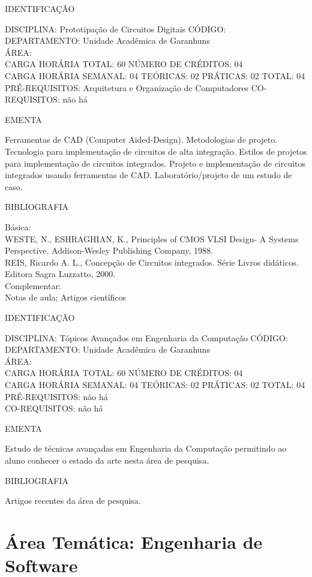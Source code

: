 \documentclass[
	12pt,				%
	openright,			%
  oneside,     %
	a4paper,			%
	english,			%
	french,				%
	spanish,			%
	brazil				%
	]{abntex2}
\begin{document}
\begin{apendicesenv}
\newpage IDENTIFICAÇÃO

DISCIPLINA: Prototipação de Circuitos Digitais CÓDIGO:\\ 
DEPARTAMENTO: Unidade Acadêmica de Garanhuns\\
ÁREA: \\
CARGA HORÁRIA TOTAL: 60 NÚMERO DE CRÉDITOS: 04\\
CARGA HORÁRIA SEMANAL: 04 TEÓRICAS: 02 PRÁTICAS: 02 TOTAL: 04\\
PRÉ-REQUISITOS: Arquitetura e Organização de Computadores
CO-REQUISITOS: não há

EMENTA 

Ferramentas de CAD (Computer Aided-Design). Metodologias de projeto.
Tecnologia para implementação de circuitos de alta integração. Estilos
de projetos para implementação de circuitos integrados. Projeto e
implementação de circuitos integrados usando ferramentas de CAD.
Laboratório/projeto de um estudo de caso.

BIBLIOGRAFIA 

Básica:\\
WESTE, N., ESHRAGHIAN, K., Principles of CMOS VLSI Design- A Systems
Perspective, Addison-Wesley Publishing Company, 1988.\\
REIS, Ricardo A. L., Concepção de Circuitos integrados. Série Livros
didáticos. Editora Sagra Luzzatto, 2000.\\
Complementar:\\
Notas de aula; Artigos científicos

\newpage IDENTIFICAÇÃO

DISCIPLINA: Tópicos Avançados em Engenharia da Computação CÓDIGO:\\ 
DEPARTAMENTO: Unidade Acadêmica de Garanhuns\\ 
ÁREA:\\
CARGA HORÁRIA TOTAL: 60 NÚMERO DE CRÉDITOS: 04\\
CARGA HORÁRIA SEMANAL: 04 TEÓRICAS: 02 PRÁTICAS: 02 TOTAL: 04\\
PRÉ-REQUISITOS: não há\\
CO-REQUISITOS: não há

EMENTA 

Estudo de técnicas avançadas em Engenharia da Computação permitindo ao
aluno conhecer o estado da arte nesta área de pesquisa.

BIBLIOGRAFIA 

Artigos recentes da área de pesquisa.
\newpage 

\section*{Área Temática: Engenharia de Software}


\end{apendicesenv}
\end{document}
